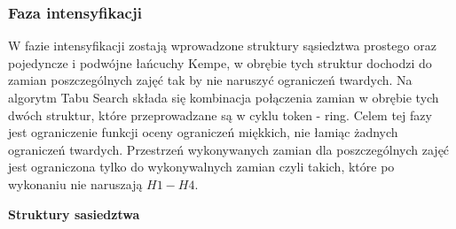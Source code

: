 \documentclass[11pt]{report}
\begin{document}
\subsubsection{Faza intensyfikacji}
\par W fazie intensyfikacji zostają wprowadzone struktury sąsiedztwa prostego oraz pojedyncze i podwójne łańcuchy Kempe, w obrębie tych struktur dochodzi do zamian poszczególnych zajęć tak by nie naruszyć ograniczeń twardych. Na algorytm Tabu Search składa się kombinacja połączenia zamian w obrębie tych dwóch struktur, które przeprowadzane są w cyklu token - ring. Celem tej fazy jest ograniczenie funkcji oceny ograniczeń miękkich, nie łamiąc żadnych ograniczeń twardych. Przestrzeń wykonywanych zamian dla poszczególnych zajęć jest ograniczona tylko do wykonywalnych zamian czyli takich, które po wykonaniu nie naruszają ${H1-H4}$.
\par \textbf{Struktury sasiedztwa}
\end{document}
